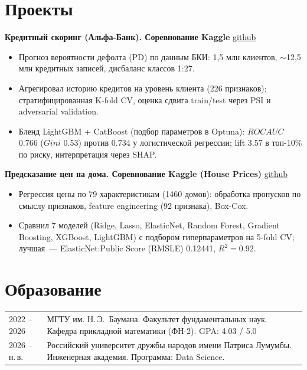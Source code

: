 \documentclass[a4paper,11pt]{article}
\begin{document}
	\section{Проекты}
	\textbf{Кредитный скоринг (Альфа-Банк). Соревнование Kaggle}
	\hfill \href{https://github.com/FDB1228/Credit_scoring}{github}
	\begin{itemize}
		\item Прогноз вероятности дефолта (PD) по данным БКИ: 1,5 млн клиентов, $\sim$12,5 млн кредитных записей, дисбаланс классов 1:27.
		\item Агрегировал историю кредитов на уровень клиента (226 признаков); стратифицированная K-fold CV, оценка сдвига train/test через PSI и adversarial validation.
		\item Бленд LightGBM + CatBoost (подбор параметров в Optuna): $ROC AUC$ 0.766 ($Gini$ 0.53) против 0.734 у логистической регрессии; lift 3.57 в топ-10\% по риску, интерпретация через SHAP.
	\end{itemize}
	
	\textbf{Предсказание цен на дома. Соревнование Kaggle (House Prices)}
	\hfill \href{https://github.com/FDB1228/house_prices}{github}
	\begin{itemize}
		\item Регрессия цены по 79 характеристикам (1460 домов): обработка пропусков по смыслу признаков, feature engineering (92 признака), Box-Cox.
		\item Сравнил 7 моделей (Ridge, Lasso, ElasticNet, Random Forest, Gradient Boosting, XGBoost, LightGBM) с подбором гиперпараметров на 5-fold CV; лучшая~--- ElasticNet:Public Score (RMSLE) 0.12441, $R^2 = 0.92$.
	\end{itemize}
	
	
	\section{Образование}
	\begin{tabularx}{\linewidth}{@{}l X@{}}
		2022 -- 2026 & МГТУ им. Н.\,Э.~Баумана. Факультет фундаментальных наук. Кафедра прикладной математики (ФН-2). GPA: 4.03 / 5.0 \\
		2026 -- н.\,в. & Российский университет дружбы народов имени Патриса Лумумбы. Инженерная академия. Программа: Data Science. \\
	\end{tabularx}
	
\end{document}
